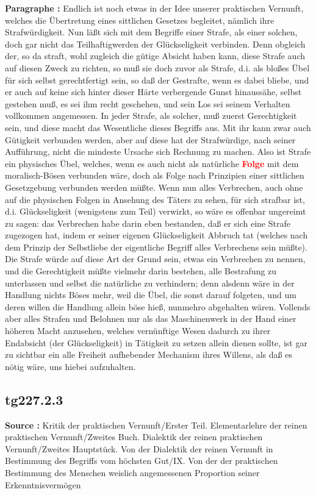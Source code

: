 \documentclass[a4paper,12pt,twoside]{book}
\newcommand{\match}[1]{\textcolor{red}{\textbf{#1}}}
\begin{document}
	\noindent\textbf{Paragraphe : }Endlich ist noch etwas in der Idee unserer praktischen Vernunft, welches die Übertretung eines sittlichen Gesetzes begleitet, nämlich ihre Strafwürdigkeit. Nun läßt sich mit dem Begriffe einer Strafe, als einer solchen, doch gar nicht das Teilhaftigwerden der Glückseligkeit verbinden. Denn obgleich der, so da straft, wohl zugleich die gütige Absicht haben kann, diese Strafe auch auf diesen Zweck zu richten, so muß sie doch zuvor als Strafe, d.i. als bloßes Übel für sich selbst gerechtfertigt sein, so daß der Gestrafte, wenn es dabei bliebe, und er auch auf keine sich hinter dieser Härte verbergende Gunst hinaussähe, selbst gestehen muß, es sei ihm recht geschehen, und sein Los sei seinem Verhalten vollkommen angemessen. In jeder Strafe, als solcher, muß zuerst Gerechtigkeit sein, und diese macht das Wesentliche dieses Begriffs aus. Mit ihr kann zwar auch Gütigkeit verbunden werden, aber auf diese hat der Strafwürdige, nach seiner Aufführung, nicht die mindeste Ursache sich Rechnung zu machen. Also ist Strafe ein physisches Übel, welches, wenn es auch nicht als natürliche \match{Folge} mit dem moralisch-Bösen verbunden wäre, doch als Folge nach Prinzipien einer sittlichen Gesetzgebung verbunden werden müßte. Wenn nun alles Verbrechen, auch ohne auf die physischen Folgen in Ansehung des Täters zu sehen, für sich strafbar ist, d.i. Glückseligkeit (wenigstens zum Teil) verwirkt, so wäre es offenbar ungereimt zu sagen: das Verbrechen habe darin eben bestanden, daß er sich eine Strafe zugezogen hat, indem er seiner eigenen Glückseligkeit Abbruch tat (welches nach dem Prinzip der Selbstliebe der eigentliche Begriff alles Verbrechens sein müßte). Die Strafe würde auf diese Art der Grund sein, etwas ein Verbrechen  zu nennen, und die Gerechtigkeit müßte vielmehr darin bestehen, alle Bestrafung zu unterlassen und selbst die natürliche zu verhindern; denn alsdenn wäre in der Handlung nichts Böses mehr, weil die Übel, die sonst darauf folgeten, und um deren willen die Handlung allein böse hieß, nunmehro abgehalten wären. Vollends aber alles Strafen und Belohnen nur als das Maschinenwerk in der Hand einer höheren Macht anzusehen, welches vernünftige Wesen dadurch zu ihrer Endabsicht (der Glückseligkeit) in Tätigkeit zu setzen allein dienen sollte, ist gar zu sichtbar ein alle Freiheit aufhebender Mechanism ihres Willens, als daß es nötig wäre, uns hiebei aufzuhalten. 
	
	\subsection*{tg227.2.3} 
	\textbf{Source : }Kritik der praktischen Vernunft/Erster Teil. Elementarlehre der reinen praktischen Vernunft/Zweites Buch. Dialektik der reinen praktischen Vernunft/Zweites Hauptstück. Von der Dialektik der reinen Vernunft in Bestimmung des Begriffs vom höchsten Gut/IX. Von der der praktischen Bestimmung des Menschen weislich angemessenen Proportion seiner Erkenntnisvermögen\\  
	
\end{document}

